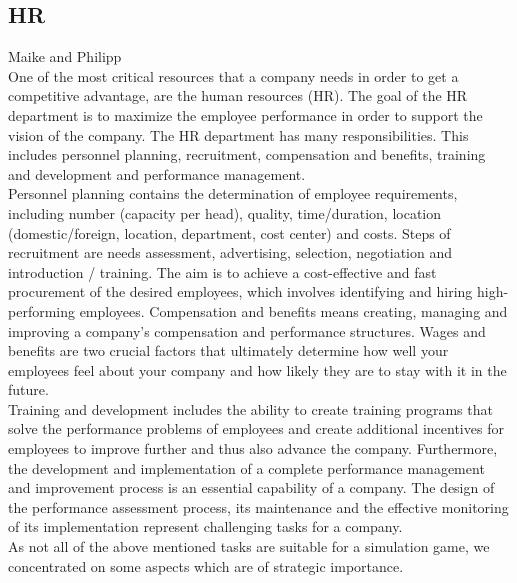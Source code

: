 \subsection{HR}
Maike and Philipp \\
One of the most critical resources that a company needs in order to get a competitive advantage, are the human resources (HR). 
The goal of the HR department is to maximize the employee performance in order to support the vision of the company. The HR department has many responsibilities. This includes personnel planning, recruitment, compensation and benefits, training and development and performance management.\\
Personnel planning contains the determination of employee requirements, including number (capacity per head), quality, time/duration, location (domestic/foreign, location, department, cost center) and costs. Steps of recruitment are needs assessment, advertising, selection, negotiation and introduction / training. The aim is to achieve a cost-effective and fast procurement of the desired employees, which involves identifying and hiring high-performing employees. 
Compensation and benefits means creating, managing and improving a company's compensation and performance structures. Wages and benefits are two crucial factors that ultimately determine how well your employees feel about your company and how likely they are to stay with it in the future.\\ 
Training and development includes the ability to create training programs that solve the performance problems of employees and create additional incentives for employees to improve further and thus also advance the company. 
Furthermore, the development and implementation of a complete performance management and improvement process is an essential capability of a company. The design of the performance assessment process, its maintenance and the effective monitoring of its implementation represent challenging tasks for a company. \\
As not all of the above mentioned tasks are suitable for a simulation game, we concentrated on some aspects which are of strategic importance.
